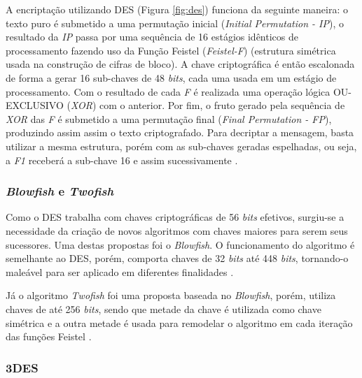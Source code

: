 \documentclass[a4paper,10pt,oneside,conference,final,keeplastbox]{inatel}
\newcommand{\bits}{\textit{bits}\xspace}
\begin{document}
                A encriptação utilizando DES (Figura \ref{fig:des}) funciona da seguinte maneira: o texto puro é submetido a uma permutação inicial (\textit{Initial Permutation - IP}), o resultado da \textit{IP} passa por uma sequência de 16 estágios idênticos de processamento fazendo uso da Função Feistel (\textit{Feistel-F}) (estrutura simétrica usada na construção de cifras de bloco). A chave criptográfica é então escalonada de forma a gerar 16 sub-chaves de 48 \bits, cada uma usada em um estágio de processamento. Com o resultado de cada \textit{F} é realizada uma operação lógica OU-EXCLUSIVO (\textit{XOR}) com o anterior. Por fim, o fruto gerado pela sequência de \textit{XOR} das \textit{F} é submetido a uma permutação final (\textit{Final Permutation - FP}), produzindo assim assim o texto criptografado. Para decriptar a mensagem, basta utilizar a mesma estrutura, porém com as sub-chaves geradas espelhadas, ou seja, a \textit{F1} receberá a sub-chave 16 e assim sucessivamente \cite{standard1999des}.
                
                
            
            \subsubsection{\textit{Blowfish} e \textit{Twofish}}
            \label{subsubsec:blowfish}
            
                Como o DES trabalha com chaves criptográficas de 56 \bits efetivos, surgiu-se a necessidade da criação de novos algoritmos com chaves maiores para serem seus sucessores. Uma destas propostas foi o \textit{Blowfish}. O funcionamento do algoritmo é semelhante ao DES, porém, comporta chaves de 32 \bits até 448 \bits, tornando-o maleável para ser aplicado em diferentes finalidades \cite{thakur2011blowfish}.
                
                Já o algoritmo \textit{Twofish} foi uma proposta baseada no \textit{Blowfish}, porém, utiliza chaves de até 256 \bits, sendo que metade da chave é utilizada como chave simétrica e a outra metade é usada para remodelar o algoritmo em cada iteração das funções Feistel \cite{lucks2001twofish}.
                
            \subsubsection{3DES}
            \label{subsubsec:3DES}
            
\end{document}
